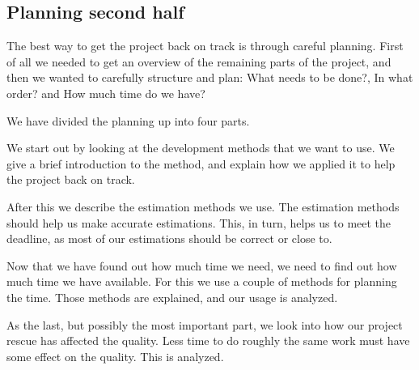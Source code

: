 \subsection{Planning second half}
The best way to get the project back on track is through careful planning. First of all we needed to get an overview of the remaining parts of the project, and then we wanted to carefully structure and plan: What needs to be done?, In what order? and How much time do we have?

We have divided the planning up into four parts.

We start out by looking at the development methods that we want to use. We give a brief introduction to the method, and explain how we applied it to help the project back on track.

After this we describe the estimation methods we use. The estimation methods should help us make accurate estimations. This, in turn, helps us to meet the deadline, as most of our estimations should be correct or close to.

Now that we have found out how much time we need, we need to find out how much time we have available. For this we use a couple of methods for planning the time. Those methods are explained, and our usage is analyzed.

As the last, but possibly the most important part, we look into how our project rescue has affected the quality. Less time to do roughly the same work must have some effect on the quality. This is analyzed.